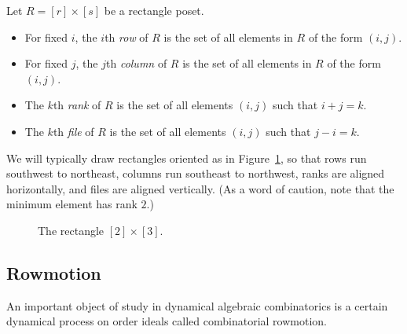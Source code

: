 \documentclass[ALCO,Unicode,published]{cedram}
\numberwithin{equation}{section}
\begin{document}
\begin{Def}
Let $R = [r] \times [s]$ be a rectangle poset.
\begin{itemize}
    \item For fixed $i$, the $i$th \emph{row} of $R$ is the set of all elements in $R$ of the form $(i,j)$. 
    \item For fixed $j$, the $j$th \emph{column} of $R$ is the set of all elements in $R$ of the form $(i,j)$. 
    \item The $k$th \emph{rank} of $R$ is the set of all elements $(i,j)$ such that $i+j=k$.
    \item The $k$th \emph{file} of $R$ is the set of all elements $(i,j)$ such that $j-i=k$.
\end{itemize}
\end{Def}
We will typically draw rectangles oriented as in Figure~\ref{squareposet}, so that rows run southwest to northeast, columns run southeast to northwest, ranks are aligned horizontally, and files are aligned vertically. (As a word of caution, note that the minimum element has rank $2$.)

\begin{figure}
\captionsetup{justification=centering}

\caption{The rectangle $[2] \times [3]$.}
 \label{squareposet}
\end{figure}

\subsection{Rowmotion}

An important object of study in dynamical algebraic combinatorics is a certain dynamical process on order ideals called combinatorial rowmotion.
\end{document}
